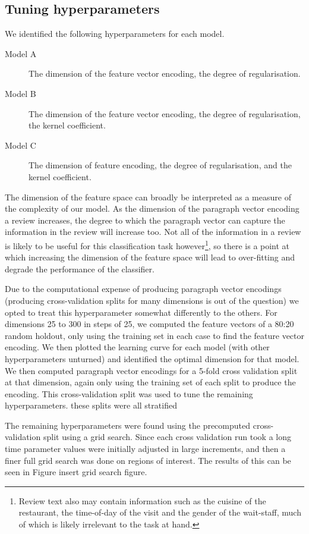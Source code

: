 \documentclass[11pt]{article}
\newcommand{\drafting}[1]{\textcolor{OliveGreen}{#1}}
\begin{document}
\subsection{Tuning hyperparameters}
We identified the following hyperparameters for each model. 
\begin{description}
	\item[Model A] The dimension of the feature vector encoding, the degree of regularisation.
	\item[Model B] The dimension of the feature vector encoding, the degree of regularisation, the kernel coefficient. 
	\item[Model C]  The dimension of feature encoding, the degree of regularisation, and the kernel coefficient.
\end{description}
The dimension of the feature space can broadly be interpreted as a measure of the complexity of our model. As the dimension of the paragraph vector encoding a review increases, the degree to which the paragraph vector can capture the information in the review will increase too. Not all of the information in a review is likely to be useful for this classification task however\footnote{Review text also may contain information such as the cuisine of the restaurant, the time-of-day of the visit and the gender of the wait-staff, much of which is likely irrelevant to the task at hand.}, so there is a point at which increasing the dimension of the feature space will lead to over-fitting and degrade the performance of the classifier. 

Due to the computational expense of producing paragraph vector encodings (producing cross-validation splits for many dimensions is out of the question) we opted to treat this hyperparameter somewhat differently to the others. For dimensions 25 to 300 in steps of 25, we computed the feature vectors of a 80:20 random holdout, only using the training set in each case to find the feature vector encoding. We then plotted the learning curve for each model (with other hyperparameters unturned) and identified the optimal dimension for that model. We then computed paragraph vector encodings for a 5-fold cross validation split at that dimension, again only using the training set of each split to produce the encoding. This cross-validation split was used to tune the remaining hyperparameters. \drafting{these splits were all stratified}

The remaining hyperparameters were found using the precomputed cross-validation split using a grid search. Since each cross validation run \drafting{took a long time} parameter values were initially adjusted in large increments, and then a finer full grid search was done on regions of interest. The results of this can be seen in Figure \drafting{insert grid search figure}.
\end{document}
